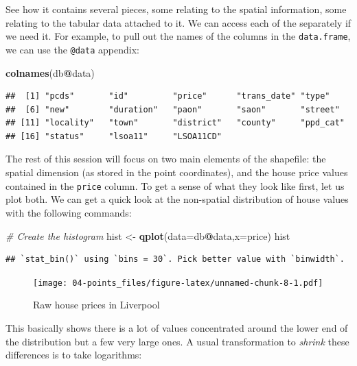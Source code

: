 \documentclass[
]{book}
\newenvironment{Shaded}{\begin{snugshade}}{\end{snugshade}}
\newcommand{\CommentTok}[1]{\textcolor[rgb]{0.56,0.35,0.01}{\textit{#1}}}
\newcommand{\DataTypeTok}[1]{\textcolor[rgb]{0.13,0.29,0.53}{#1}}
\newcommand{\KeywordTok}[1]{\textcolor[rgb]{0.13,0.29,0.53}{\textbf{#1}}}
\newcommand{\NormalTok}[1]{#1}
\newcommand{\OperatorTok}[1]{\textcolor[rgb]{0.81,0.36,0.00}{\textbf{#1}}}
\newcommand{\StringTok}[1]{\textcolor[rgb]{0.31,0.60,0.02}{#1}}
\begin{document}
See how it contains several pieces, some relating to the spatial information, some relating to the tabular data attached to it. We can access each of the separately if we need it. For example, to pull out the names of the columns in the \texttt{data.frame}, we can use the \texttt{@data} appendix:

\begin{Shaded}
\begin{Highlighting}[]
\KeywordTok{colnames}\NormalTok{(db}\OperatorTok{@}\NormalTok{data)}
\end{Highlighting}
\end{Shaded}

\begin{verbatim}
##  [1] "pcds"       "id"         "price"      "trans_date" "type"      
##  [6] "new"        "duration"   "paon"       "saon"       "street"    
## [11] "locality"   "town"       "district"   "county"     "ppd_cat"   
## [16] "status"     "lsoa11"     "LSOA11CD"
\end{verbatim}

The rest of this session will focus on two main elements of the shapefile: the spatial dimension (as stored in the point coordinates), and the house price values contained in the \texttt{price} column. To get a sense of what they look like first, let us plot both. We can get a quick look at the non-spatial distribution of house values with the following commands:

\begin{Shaded}
\begin{Highlighting}[]
\CommentTok{# Create the histogram}
\NormalTok{hist <-}\StringTok{ }\KeywordTok{qplot}\NormalTok{(}\DataTypeTok{data=}\NormalTok{db}\OperatorTok{@}\NormalTok{data,}\DataTypeTok{x=}\NormalTok{price)}
\NormalTok{hist}
\end{Highlighting}
\end{Shaded}

\begin{verbatim}
## `stat_bin()` using `bins = 30`. Pick better value with `binwidth`.
\end{verbatim}

\begin{figure}
\centering
\texttt{[image: 04-points\_files/figure-latex/unnamed-chunk-8-1.pdf]}
\caption{\label{fig:unnamed-chunk-8}Raw house prices in Liverpool}
\end{figure}

This basically shows there is a lot of values concentrated around the lower end of the distribution but a few very large ones. A usual transformation to \emph{shrink} these differences is to take logarithms:
\end{document}
